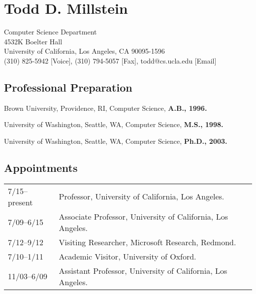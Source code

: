 \documentclass[11pt]{article}
\begin{document}
  
\section*{Todd D. Millstein}
\vspace{-.15in}
Computer Science Department\\
4532K Boelter Hall\\
University of California, Los Angeles, CA  90095-1596\\
(310) 825-5942 [Voice], (310) 794-5057 [Fax], todd@cs.ucla.edu [Email]

\subsection*{Professional Preparation}

Brown University, Providence, RI, Computer Science, {\bf
  A.B., 1996.}

\noindent
University of Washington, Seattle, WA, Computer Science,
{\bf M.S., 1998.} 

\noindent
University of Washington, Seattle, WA, Computer Science,
{\bf Ph.D., 2003.}

\subsection*{Appointments}

\begin{tabular}{ll}
7/15--present & Professor, University of California, Los Angeles. \\
7/09--6/15 & Associate Professor, University of California, Los Angeles. \\
7/12--9/12 & Visiting Researcher, Microsoft Research, Redmond.\\
7/10--1/11 & Academic Visitor, University of Oxford.\\
11/03--6/09 & Assistant Professor, %
University of California, Los Angeles. 
\end{tabular}
\end{document}
